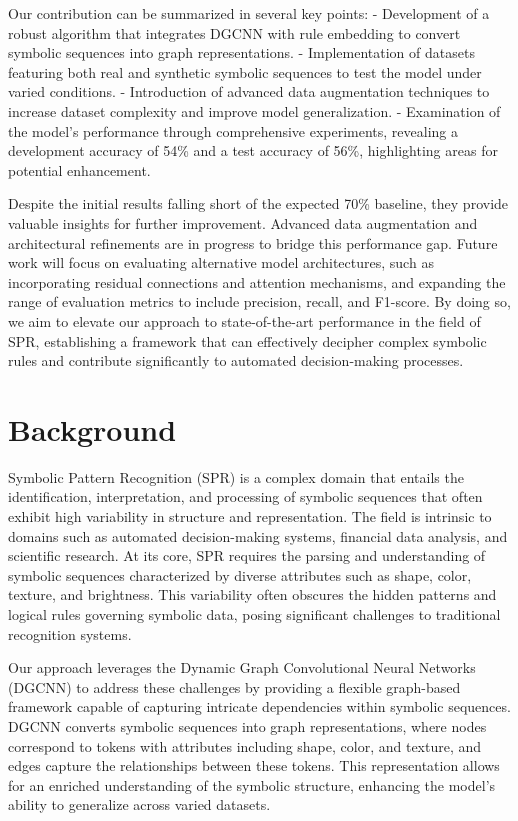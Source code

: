 \documentclass{article}
\begin{document}
Our contribution can be summarized in several key points:
- Development of a robust algorithm that integrates DGCNN with rule embedding to convert symbolic sequences into graph representations.
- Implementation of datasets featuring both real and synthetic symbolic sequences to test the model under varied conditions.
- Introduction of advanced data augmentation techniques to increase dataset complexity and improve model generalization.
- Examination of the model's performance through comprehensive experiments, revealing a development accuracy of 54\% and a test accuracy of 56\%, highlighting areas for potential enhancement.

Despite the initial results falling short of the expected 70\% baseline, they provide valuable insights for further improvement. Advanced data augmentation and architectural refinements are in progress to bridge this performance gap. Future work will focus on evaluating alternative model architectures, such as incorporating residual connections and attention mechanisms, and expanding the range of evaluation metrics to include precision, recall, and F1-score. By doing so, we aim to elevate our approach to state-of-the-art performance in the field of SPR, establishing a framework that can effectively decipher complex symbolic rules and contribute significantly to automated decision-making processes.

\section{Background}
Symbolic Pattern Recognition (SPR) is a complex domain that entails the identification, interpretation, and processing of symbolic sequences that often exhibit high variability in structure and representation. The field is intrinsic to domains such as automated decision-making systems, financial data analysis, and scientific research. At its core, SPR requires the parsing and understanding of symbolic sequences characterized by diverse attributes such as shape, color, texture, and brightness. This variability often obscures the hidden patterns and logical rules governing symbolic data, posing significant challenges to traditional recognition systems.

Our approach leverages the Dynamic Graph Convolutional Neural Networks (DGCNN) to address these challenges by providing a flexible graph-based framework capable of capturing intricate dependencies within symbolic sequences. DGCNN converts symbolic sequences into graph representations, where nodes correspond to tokens with attributes including shape, color, and texture, and edges capture the relationships between these tokens. This representation allows for an enriched understanding of the symbolic structure, enhancing the model's ability to generalize across varied datasets.
\end{document}
